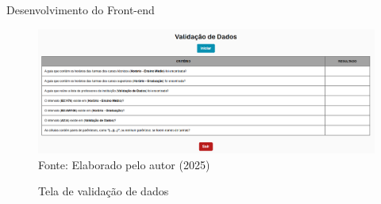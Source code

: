 \begin{frame}{Desenvolvimento do Front-end}
    \begin{figure}
        \centering
        \vspace{-0.5cm}
        \caption{Tela de validação de dados}
        \vspace{-0.2cm}
        \includegraphics[width=1\textwidth]{figuras/front-10.png}
        \\ %
        \small Fonte: Elaborado pelo autor (2025)
    \end{figure}
\end{frame}

